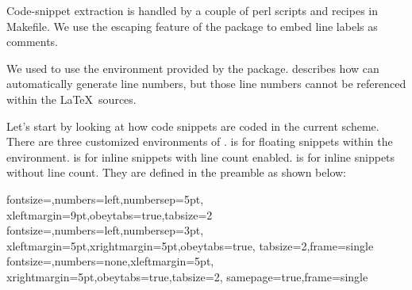 Code-snippet extraction is handled by a couple of
perl scripts and recipes in Makefile.
We use the escaping feature of the  package
to embed line labels as comments.

We used to use the  environment provided
by the  package.
 describes how
 can automatically generate line numbers,
but those line numbers cannot be referenced within the \LaTeX\ sources.

Let's start by looking at how code snippets are coded in the current scheme.
There are three customized environments of .
 is for floating snippets within the 
environment.
 is for inline snippets with line count enabled.
 is for inline snippets without line count.
They are defined in the preamble as shown below:

\begin{VerbatimU}
%
  {fontsize=\scriptsize,numbers=left,numbersep=5pt,%
    xleftmargin=9pt,obeytabs=true,tabsize=2}
%
  {fontsize=\scriptsize,numbers=left,numbersep=3pt,%
    xleftmargin=5pt,xrightmargin=5pt,obeytabs=true,%
    tabsize=2,frame=single}
%
  {fontsize=\scriptsize,numbers=none,xleftmargin=5pt,%
    xrightmargin=5pt,obeytabs=true,tabsize=2,%
    samepage=true,frame=single}
\end{VerbatimU}


\begin{listing}
\begin{fcvlabel}
\end{fcvlabel}
\vspace*{-9pt}
\caption{\LaTeX\ Source of Sample Code Snippet (Current)}
\label{lst:app:styleguide:LaTeX Source of Sample Code Snippet (Current)}
\end{listing}

